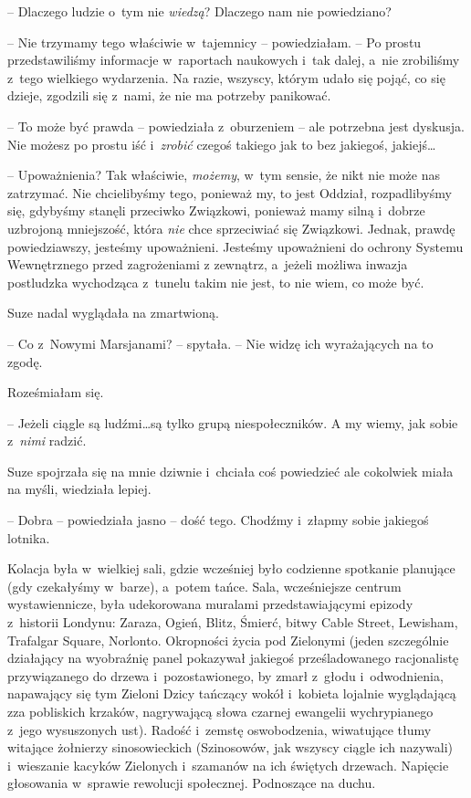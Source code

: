 \documentclass[oneside,polish,11pt,sfheadings]{mwbk}
\begin{document}
-- Dlaczego ludzie o~tym nie \textit{wiedzą}? Dlaczego nam nie powiedziano?

-- Nie trzymamy tego właściwie w~tajemnicy -- powiedziałam. -- Po prostu
przedstawiliśmy informacje w~raportach naukowych i~tak dalej, a~nie
zrobiliśmy z~tego wielkiego wydarzenia. Na razie, wszyscy, którym udało
się pojąć, co się dzieje, zgodzili się z~nami, że nie ma potrzeby
panikować.

-- To może być prawda -- powiedziała z~oburzeniem -- ale potrzebna jest
dyskusja. Nie możesz po prostu iść i~\textit{zrobić} czegoś takiego jak to
bez jakiegoś, jakiejś\ldots 

-- Upoważnienia? Tak właściwie, \textit{możemy}, w~tym sensie, że nikt nie
może nas zatrzymać. Nie chcielibyśmy tego, ponieważ my, to jest Oddział,
rozpadlibyśmy się, gdybyśmy stanęli przeciwko Związkowi, ponieważ mamy
silną i~dobrze uzbrojoną mniejszość, która \textit{nie} chce sprzeciwiać
się Związkowi. Jednak, prawdę powiedziawszy, jesteśmy upoważnieni.
Jesteśmy upoważnieni do ochrony Systemu Wewnętrznego przed zagrożeniami
z zewnątrz, a~jeżeli możliwa inwazja postludzka wychodząca z~tunelu
takim nie jest, to nie wiem, co może być.

Suze nadal wyglądała na zmartwioną. 

-- Co z~Nowymi Marsjanami? -- spytała.
-- Nie widzę ich wyrażających na to zgodę.

Roześmiałam się. 

-- Jeżeli ciągle są ludźmi\ldots  są tylko grupą
niespołeczników. A my wiemy, jak sobie z~\textit{nimi} radzić.

Suze spojrzała się na mnie dziwnie i~chciała coś powiedzieć ale
cokolwiek miała na myśli, wiedziała lepiej.

-- Dobra -- powiedziała jasno -- dość tego. Chodźmy i~złapmy sobie jakiegoś
lotnika.

Kolacja była w~wielkiej sali, gdzie wcześniej było codzienne spotkanie
planujące (gdy czekałyśmy w~barze), a~potem tańce. Sala, wcześniejsze
centrum wystawiennicze, była udekorowana muralami przedstawiającymi
epizody z~historii Londynu: Zaraza, Ogień, Blitz, Śmierć, bitwy Cable
Street, Lewisham, Trafalgar Square, Norlonto. Okropności życia pod
Zielonymi (jeden szczególnie działający na wyobraźnię panel pokazywał
jakiegoś prześladowanego racjonalistę przywiązanego do drzewa i~pozostawionego, by zmarł z~głodu i~odwodnienia, napawający się tym
Zieloni Dzicy tańczący wokół i~kobieta lojalnie wyglądającą zza
pobliskich krzaków, nagrywającą słowa czarnej ewangelii wychrypianego z~jego wysuszonych ust). Radość i~zemstę oswobodzenia, wiwatujące tłumy
witające żołnierzy sinosowieckich (Szinosowów, jak wszyscy ciągle ich
nazywali) i~wieszanie kacyków Zielonych i~szamanów na ich świętych
drzewach. Napięcie głosowania w~sprawie rewolucji społecznej. Podnoszące
na duchu.
\end{document}
